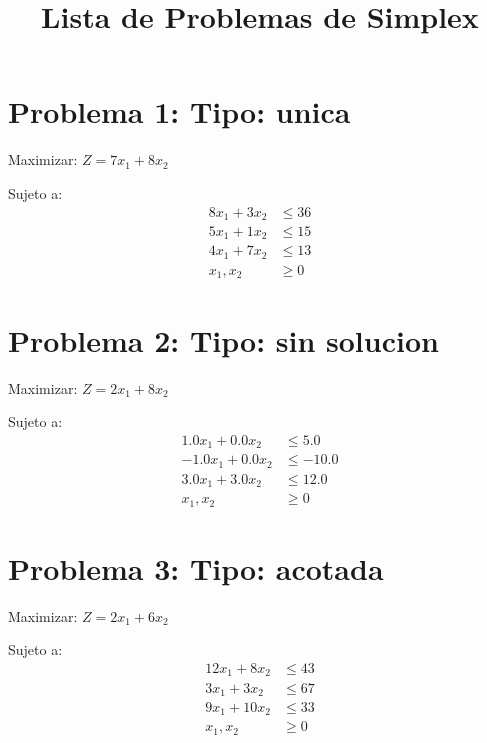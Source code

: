 \documentclass{article}
\begin{document}
\title{Lista de Problemas de Simplex}
\maketitle
\section*{Problema 1: Tipo: unica}
Maximizar: $Z = 7x_1 + 8x_2$

Sujeto a:
\begin{align*}
8x_1 + 3x_2 &\leq 36 \\
5x_1 + 1x_2 &\leq 15 \\
4x_1 + 7x_2 &\leq 13 \\
x_1, x_2 &\geq 0
\end{align*}
\vspace{1cm}
\section*{Problema 2: Tipo: sin solucion}
Maximizar: $Z = 2x_1 + 8x_2$

Sujeto a:
\begin{align*}
1.0x_1 + 0.0x_2 &\leq 5.0 \\
-1.0x_1 + 0.0x_2 &\leq -10.0 \\
3.0x_1 + 3.0x_2 &\leq 12.0 \\
x_1, x_2 &\geq 0
\end{align*}
\vspace{1cm}
\section*{Problema 3: Tipo: acotada}
Maximizar: $Z = 2x_1 + 6x_2$

Sujeto a:
\begin{align*}
12x_1 + 8x_2 &\leq 43 \\
3x_1 + 3x_2 &\leq 67 \\
9x_1 + 10x_2 &\leq 33 \\
x_1, x_2 &\geq 0
\end{align*}
\vspace{1cm}
\end{document}
